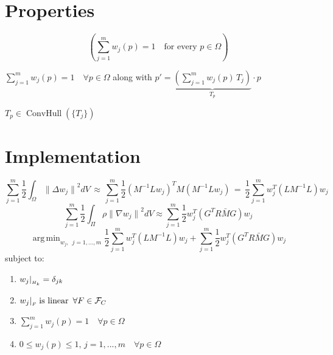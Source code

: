 \documentclass[11pt]{article} %
\newcommand{\norm}[2][]{{\|#2\|}_{#1}}
\DeclareMathOperator*{\argmin}{arg\,min}
\DeclareMathOperator*{\convhull}{ConvHull}
\begin{document}
\section{Properties}
\[
	( \displaystyle\sum_{j=1}^ m w_j(p) = 1 \quad \text{for every } p\in \Omega )
\]

$\displaystyle\sum_{j=1}^ m w_j(p) = 1 \quad \forall p\in \Omega$ along with $p' = \underbrace{\left( \sum_{j=1}^m w_j(p)\, T_j \right)}_{T_p} \cdot p$ 

$T_p \in \convhull \left( \{ T_j \} \right) $

\section{Implementation}
\[
	\sum_{j=1}^m \frac{1}{2}\int_\Omega \norm{\Delta w_j}^2 dV \,\approx\, \sum_{j=1}^m \frac{1}{2} (M^{-1}Lw_j)^TM(M^{-1}Lw_j)\, =\, \frac{1}{2}\sum_{j=1}^m w_j^T (LM^{-1}L)w_j
\]
\[
	\sum_{j=1}^m \frac{1}{2} \int_\Pi \rho \norm{\nabla w_j}^2 dV \approx \sum_{j=1}^m \frac{1}{2} w_j^T(G^TR\bar{M}G)w_j
\]
\[
	\argmin_{w_j,\enspace  j=1,...,m} \frac{1}{2}\sum_{j=1}^m w_j^T (LM^{-1}L)w_j + \sum_{j=1}^m \frac{1}{2} w_j^T(G^TR\bar{M}G)w_j
\]
subject to: 
\begin{enumerate}[label=\arabic*)]
	\item $w_j |_{\raisebox{-1pt}{\tiny $H_k$}} = \delta_{jk}$
	\item $w_j |_{\raisebox{-1pt}{\tiny $F$}} \; \text{is linear} \enspace \forall F\in \mathcal{F}_C $
	\item $\displaystyle\sum_{j=1}^ m w_j(p) = 1 \quad \forall p\in \Omega$
	\item $0\leq w_j(p) \leq 1, \, j=1,...,m \quad \forall p \in \Omega$
\end{enumerate}
\end{document}
